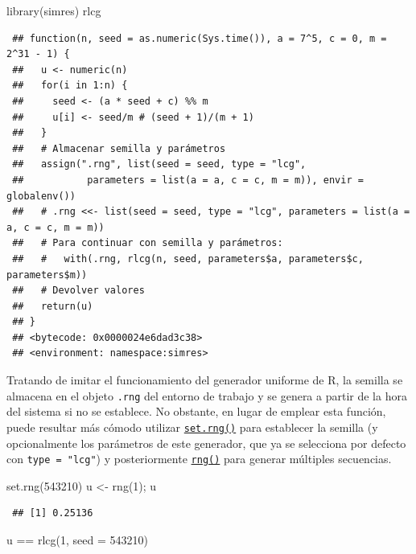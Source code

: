 \documentclass[
  10pt,
]{book}
\newenvironment{Shaded}{\begin{snugshade}}{\end{snugshade}}
\newcommand{\AttributeTok}[1]{\textcolor[rgb]{0.77,0.63,0.00}{#1}}
\newcommand{\DecValTok}[1]{\textcolor[rgb]{0.00,0.00,0.81}{#1}}
\newcommand{\FunctionTok}[1]{\textcolor[rgb]{0.00,0.00,0.00}{#1}}
\newcommand{\NormalTok}[1]{#1}
\newcommand{\OtherTok}[1]{\textcolor[rgb]{0.56,0.35,0.01}{#1}}
\newcommand{\SpecialCharTok}[1]{\textcolor[rgb]{0.00,0.00,0.00}{#1}}
\theoremstyle{break}
\theoremstyle{nonumberplain}
\begin{document}
\begin{Shaded}
\begin{Highlighting}[]
\FunctionTok{library}\NormalTok{(simres)}
\NormalTok{rlcg}
\end{Highlighting}
\end{Shaded}

\begin{verbatim}
 ## function(n, seed = as.numeric(Sys.time()), a = 7^5, c = 0, m = 2^31 - 1) {
 ##   u <- numeric(n)
 ##   for(i in 1:n) {
 ##     seed <- (a * seed + c) %% m
 ##     u[i] <- seed/m # (seed + 1)/(m + 1)
 ##   }
 ##   # Almacenar semilla y parámetros
 ##   assign(".rng", list(seed = seed, type = "lcg",
 ##           parameters = list(a = a, c = c, m = m)), envir = globalenv())
 ##   # .rng <<- list(seed = seed, type = "lcg", parameters = list(a = a, c = c, m = m))
 ##   # Para continuar con semilla y parámetros:
 ##   #   with(.rng, rlcg(n, seed, parameters$a, parameters$c, parameters$m))
 ##   # Devolver valores
 ##   return(u)
 ## }
 ## <bytecode: 0x0000024e6dad3c38>
 ## <environment: namespace:simres>
\end{verbatim}

Tratando de imitar el funcionamiento del generador uniforme de R, la semilla se almacena en el objeto \texttt{.rng} del entorno de trabajo y se genera a partir de la hora del sistema si no se establece.
No obstante, en lugar de emplear esta función, puede resultar más cómodo utilizar \href{https://rubenfcasal.github.io/simres/reference/set.rng.html}{\texttt{set.rng()}} para establecer la semilla (y opcionalmente los parámetros de este generador, que ya se selecciona por defecto con \texttt{type\ =\ "lcg"}) y posteriormente \href{https://rubenfcasal.github.io/simres/reference/set.rng.html}{\texttt{rng()}} para generar múltiples secuencias.

\begin{Shaded}
\begin{Highlighting}[]
\FunctionTok{set.rng}\NormalTok{(}\DecValTok{543210}\NormalTok{)}
\NormalTok{u }\OtherTok{\textless{}{-}} \FunctionTok{rng}\NormalTok{(}\DecValTok{1}\NormalTok{); u}
\end{Highlighting}
\end{Shaded}

\begin{verbatim}
 ## [1] 0.25136
\end{verbatim}

\begin{Shaded}
\begin{Highlighting}[]
\NormalTok{u }\SpecialCharTok{==} \FunctionTok{rlcg}\NormalTok{(}\DecValTok{1}\NormalTok{, }\AttributeTok{seed =} \DecValTok{543210}\NormalTok{)}
\end{Highlighting}
\end{Shaded}
\end{document}
